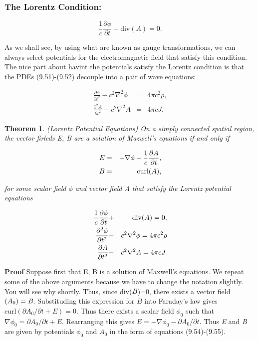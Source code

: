 \documentclass[12pt]{book}
\newtheorem{theorem}{Theorem}
\begin{document}
\subsubsection*{The Lorentz Condition:}

	\begin{equation}
	\frac{1}{c}\frac{\partial \phi}{\partial t}+\textrm{div}(A)=0.
	\end{equation}


	\noindent As we shall see, by using what are known as gauge transformations, we can always select potentials for the electromagnetic field that satisfy this condition. The nice part about havint the potentials satisfy the Lorentz condition is that the PDEs (9.51)-(9.52) decouple into a pair of wave equations:

	\begin{eqnarray*}
	\frac{\partial \phi}{\partial t^2}-c^2 \nabla^2 \phi & = & 4\pi c^2 \rho, \\
	\frac{\partial^2 A}{\partial t^2} - c^2\nabla^2 A & = & 4\pi c J.
	\end{eqnarray*}


\begin{theorem} (Lorentz Potential Equations) On a simply connected spatial region, the vector firleds E, B are a solution of Mazwell's equations if and only if


\begin{eqnarray}
		E & = & - \nabla \phi - \frac{1}{c}\frac{\partial A}{\partial t}, \\
		B & = & \textup{curl}(A),
\end{eqnarray}

	\noindent for some scalar field $\phi$ and vector field A that satisfy the Lorentz potential equations

	\begin{eqnarray}
		\frac{1}{c}\frac{\partial \phi}{\partial t} & + & \textup{div}(A) = 0, \\
		\frac{\partial^2 \phi}{\partial t^2} & - & c^2 \nabla^2 \phi = 4\pi c^2 \rho \\
		\frac{\partial A}{\partial t^2} & - & c^2 \nabla^2 A = 4\pi c J.
	\end{eqnarray}

\end{theorem}



\noindent \textbf{Proof} \indent Suppose first that E, B is a solution of Maxwell's equations. We repeat some of the above arguments because we have to change the notation slightly. You will see why shortly. Thus, since div($\emph{B}$)=0, there exists a vector field $(A_0)=\emph{B}$. Substituding this expression for $B$ into Faraday's law gives $\textrm{curl}(\partial A_0 / \partial t + E) = 0$. Thus there exists a scalar field $\phi_0$ such that $\nabla \phi_0 = \partial A_0 / \partial t + E$. Rearranging this gives $E = - \nabla \phi_0 - \partial A_0 / \partial t$. Thus \emph{E} and \emph{B} are given by potentials $\phi_0$ and $A_0$ in the form of equations (9.54)-(9.55).
\end{document}
